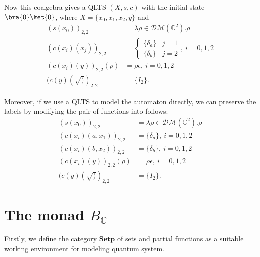 \documentclass{llncs}
\newcommand{\C}{\mathbb{C}}
\newcommand{\BC}{B_{\mathbb{C}}}
\begin{document}
\begin{example}[\cite{F12}]
Now this coalgebra gives a QLTS $(X,s,c)$ with the initial state $\bra{0}\ket{0}$, where $X=\{x_0,x_1,x_2,y\}$ and 
$$
\begin{aligned}
(s(x_0))_{2,2}&=\lambda \rho\in \mathcal{DM}(\C^{2}). \rho\\
(c(x_i)(x_j))_{2,2}&=\begin{cases}
\{\delta_a\} &j=1\\
\{\delta_b\} &j=2
\end{cases},\ i=0,1,2\\
(c(x_i)(y))_{2,2}(\rho)&=\rho \epsilon,\ i=0,1,2\\
(c(y)(\surd))_{2,2}&=\{I_2\}.
\end{aligned}
$$


\end{example}

Moreover, if we use a QLTS to model the automaton directly, we can preserve the labels by modifying the pair of functions into follows:
$$
\begin{aligned}
(s(x_0))_{2,2}&=\lambda \rho\in \mathcal{DM}(\C^{2}). \rho\\
(c(x_i)(a,x_1))_{2,2}&=\{\delta_a\},\ i=0,1,2\\
(c(x_i)(b,x_2))_{2,2}&=\{\delta_b\},\ i=0,1,2\\
(c(x_i)(y))_{2,2}(\rho)&=\rho \epsilon,\ i=0,1,2\\
(c(y)(\surd))_{2,2}&=\{I_2\}.
\end{aligned}
$$

\begin{comment}
\begin{theorem}
QLISs in \cite{H14} are more expressive than the coalgebraic models in \cite{F12}.
\end{theorem}

\begin{proof}
To be proved.
\end{proof}
\end{comment}

\section{The monad $\BC$}

Firstly, we define the category $\mathbf{Setp}$ of sets and partial functions as a suitable working environment for modeling quantum system.
\end{document}
